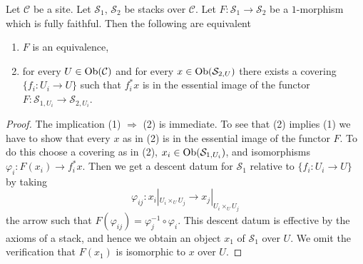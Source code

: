 \begin{lemma}
\label{lemma-characterize-essentially-surjective-when-ff}
Let $\mathcal{C}$ be a site.
Let $\mathcal{S}_1$, $\mathcal{S}_2$ be stacks over $\mathcal{C}$.
Let $F : \mathcal{S}_1 \to \mathcal{S}_2$ be a $1$-morphism which is
fully faithful. Then the following are equivalent
\begin{enumerate}
\item $F$ is an equivalence,
\item for every $U \in \mathop{\mathrm{Ob}}\nolimits(\mathcal{C})$ and for every
$x \in \mathop{\mathrm{Ob}}\nolimits(\mathcal{S}_{2, U})$ there exists a covering
$\{f_i : U_i \to U\}$ such that $f_i^*x$ is in the essential image
of the functor $F : \mathcal{S}_{1, U_i} \to \mathcal{S}_{2, U_i}$.
\end{enumerate}
\end{lemma}

\begin{proof}
The implication (1) $\Rightarrow$ (2) is immediate.
To see that (2) implies (1) we have to show that every
$x$ as in (2) is in the essential image of the functor $F$.
To do this choose a covering as in (2),
$x_i \in \mathop{\mathrm{Ob}}\nolimits(\mathcal{S}_{1, U_i})$, and
isomorphisms $\varphi_i : F(x_i) \to f_i^*x$. Then we get a descent
datum for $\mathcal{S}_1$ relative to $\{f_i : U_i \to U\}$
by taking
$$
\varphi_{ij} :
x_i|_{U_i \times_U U_j}
\longrightarrow
x_j|_{U_i \times_U U_j}
$$
the arrow such that $F(\varphi_{ij}) = \varphi_j^{-1} \circ \varphi_i$.
This descent datum is effective by the axioms of a stack, and hence
we obtain an object $x_1$ of $\mathcal{S}_1$ over $U$. We omit the
verification that $F(x_1)$ is isomorphic to $x$ over $U$.
\end{proof}

